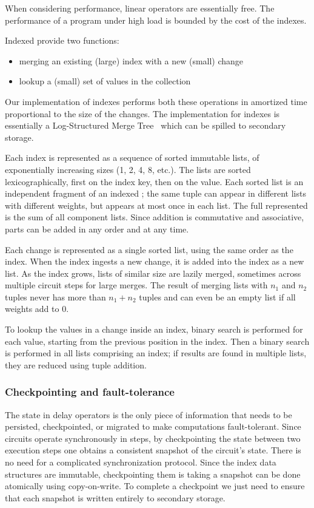 When considering performance, linear operators are essentially free.
The performance of a \dbsp program under high load is bounded by the
cost of the indexes.

Indexed provide two functions:
\begin{itemize}
\item merging an existing (large) index with a new (small) change
\item lookup a (small) set of values in the collection
\end{itemize}

Our implementation of indexes performs both these operations in
amortized time proportional to the size of the changes.  The
implementation for indexes is essentially a Log-Structured Merge
Tree~\cite{oneil-ai96} which can be spilled to secondary storage.

Each index is represented as a sequence of sorted immutable lists, of
exponentially increasing sizes (1, 2, 4, 8, etc.).  The lists are
sorted lexicographically, first on the index key, then on the value.
Each sorted list is an independent fragment of an indexed \zr; the
same tuple can appear in different lists with different weights, but
appears at most once in each list.  The full \zr represented is the
sum of all component lists.  Since addition is commutative and
associative, parts can be added in any order and at any time.

Each change is represented as a single sorted list, using the same
order as the index.  When the index ingests a new change, it is added
into the index as a new list.  As the index grows, lists of similar
size are lazily merged, sometimes across multiple circuit steps for
large merges.  The result of merging lists with \(n_1\) and \(n_2\)
tuples never has more than \(n_1 + n_2\) tuples and can even be an
empty list if all weights add to 0.

To lookup the values in a change inside an index, binary search is
performed for each value, starting from the previous position in the
index.  Then a binary search is performed in all lists comprising an
index; if results are found in multiple lists, they are reduced using
tuple addition.

\subsubsection{Checkpointing and fault-tolerance}

The state in delay operators is the only piece of information that
needs to be persisted, checkpointed, or migrated to make \dbsp
computations fault-tolerant.  Since \dbsp circuits operate
synchronously in steps, by checkpointing the state between two
execution steps one obtains a consistent snapshot of the circuit's
state.  There is no need for a complicated synchronization protocol.
Since the index data structures are immutable, checkpointing them is
taking a snapshot can be done atomically using copy-on-write.  To
complete a checkpoint we just need to ensure that each snapshot is
written entirely to secondary storage.


